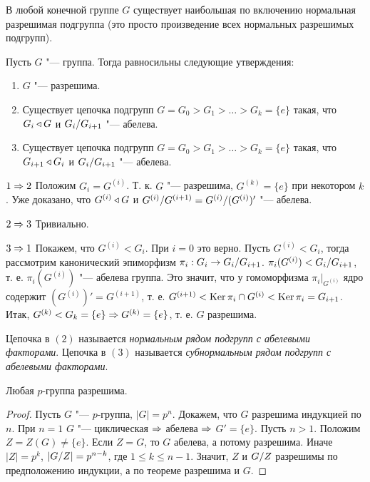 \documentclass[main]{subfiles}
\begin{document}
\begin{corollary}
  В любой конечной группе $G$ существует
  наибольшая по включению нормальная разрешимая подгруппа
  (это просто произведение всех нормальных разрешимых подгрупп).
\end{corollary}

\begin{theorem}
  Пусть $G$ "--- группа. Тогда равносильны следующие утверждения:
  \begin{enumerate}
    \item $G$ "--- разрешима.
    \item Существует цепочка подгрупп $G = G_0 > G_1 > \dots > G_k = \{ e \}$
      такая, что $G_i \triangleleft G$ и
      $\Factor{G_i}[G_{i+1}]$ "--- абелева.
    \item Существует цепочка подгрупп $G = G_0 > G_1 > \dots > G_k = \{ e \}$ такая,
      что $G_{i + 1} \triangleleft G_i$
      и $\Factor{G_i}[G_{i+1}]$ "--- абелева.
  \end{enumerate}
\end{theorem}
\begin{itemproof}
  \item[$1 \Rightarrow 2$] Положим $G_i = G^{(i)}$.
    Т. к. $G$ "--- разрешима,
    $G^{(k)} = \{ e \}$ при некотором $k$.
    Уже доказано, что $G^{(i)} \triangleleft G$ и
    $\Factor{G^{(i)}}[G^{(i + 1)}] = \Factor{G^{(i)}}[(G^{(i)})']$ "--- абелева.
  \item[$2 \Rightarrow 3$] Тривиально.
  \item[$3 \Rightarrow 1$] Покажем, что $G^{(i)} < G_i$.
    При $i = 0$ это верно.
    Пусть $G^{(i)} < G_i$,
    тогда рассмотрим канонический эпиморфизм
    $\pi_i : G_i \to \Factor{G_i}[G_{i+1}]$.
    $\pi_i(G^{(i)}) < \Factor{G_i}[G_{i + 1}]$,
    т. е.  $\pi_i(G^{(i)})$ "--- абелева группа.
    Это значит, что у гомоморфизма
    $\pi_i \bigr|_{G^{(i)}}$
    ядро содержит $(G^{(i)})' = G^{(i+1)}$,
    т. е. $G^{(i + 1)} < \operatorname{Ker} \pi_i \cap G^{(i)}
    < \operatorname{Ker} \pi_i = G_{i + 1}$.
    Итак, $G^{(k)} < G_k = \{ e \} \Rightarrow G^{(k)} = \{ e \}$,
    т. е. $G$ разрешима.
\end{itemproof}

\begin{remark}
  Цепочка в $(2)$ называется \emph{нормальным рядом подгрупп с абелевыми факторами}.
  Цепочка в $(3)$ называется \emph{субнормальным рядом подгрупп с абелевыми факторами}.
\end{remark}

\begin{proposition}
  Любая $p$-группа разрешима.
\end{proposition}
\begin{proof}
  Пусть $G$ "--- $p$-группа, $|G| = p^n$. Докажем, что $G$ разрешима индукцией по $n$.
  При $n = 1$ $G$ "--- циклическая $\Rightarrow$ абелева $\Rightarrow$ $G' = \{ e \}$.
  Пусть $n > 1$. Положим $Z = Z(G) \ne \{ e \}$. Если $Z = G$, то $G$ абелева, а
  потому разрешима. Иначе $|Z| = p^k$, $|\Factor{G}[Z]| = p^{n - k}$, где $1 \le k \le n - 1$.
  Значит, $Z$ и $\Factor{G}[Z]$ разрешимы по предположению индукции, а по теореме разрешима
  и $G$.
\end{proof}
\end{document}
